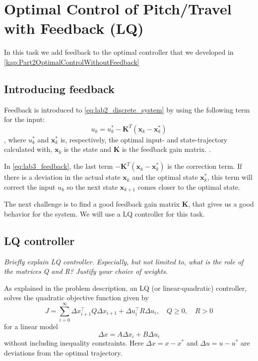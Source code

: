 \documentclass[../main.tex]{subfiles}
\begin{document}
	
\section{Optimal Control of Pitch/Travel with Feedback (LQ)}
In this task we add feedback to the optimal controller that we developed in \cref{kap:Part2OptimalControlWithoutFeedback}

\subsection{Introducing feedback}
Feedback is introduced to \cref{eq:lab2_discrete_system} by using the following term for the input:
\begin{equation}\label{eq:lab3_feedback}
	u_k = u_k^* - \bm{K}^T(\bm x_k - \bm x_k^*)
\end{equation}, 
where $ u_k^* $ and $ \bm x_k^* $ is, respectively, the optimal input- and state-trajectory calculated with, $ \bm x_k $ is the state and $ \bm K $ is the feedback gain matrix.
.

In \cref{eq:lab3_feedback}, the last term $ -\bm{K}^T(\bm x_k - \bm x_k^*) $ is the correction term. If there is a deviation in the actual state $ \bm x_k $ and the optimal state $ \bm x_k^* $, this term will correct the input $ u_k $ so the next state $ \bm x_{k + 1} $ comes closer to the optimal state. 

The next challenge is to find a good feedback gain matrix $ \bm K $, that gives us a good behavior for the system. We will use a LQ controller for this task.

\subsection{LQ controller}
\textit{Briefly explain LQ controller. Especially, but not limited to, what is the role of the matrices Q and R? Justify your choice of weights.}

As explained in the problem description, an LQ (or linear-quadratic) controller, solves the quadratic objective function given by
\begin{equation}
    J = \sum^\infty_{i=0} \Delta x_{i+1}^\top Q \Delta x_{i+1} + \Delta u_i^\top R \Delta u_i, \quad Q \ge0, \quad R > 0
\end{equation}
for a linear model
\begin{equation}\label{eq:lab3_lin_model}
	\Delta x=A\Delta x_i + B \Delta u_i
\end{equation}
without including inequality constraints.
Here $ \Delta x = x - x^*$ and $\Delta u = u - u^*$ are deviations from the optimal trajectory.
\end{document}

